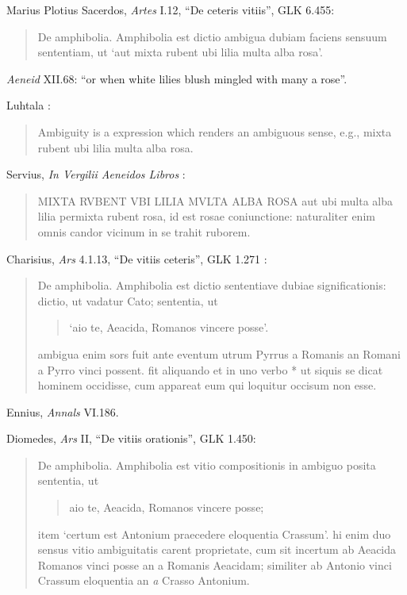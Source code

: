 \documentclass{article}
\begin{document}
Marius Plotius Sacerdos, {\em Artes} I.12, ``De ceteris vitiis'', GLK 6.455:

\begin{quote}
De amphibolia. Amphibolia est dictio ambigua dubiam faciens sensuum sententiam, ut `aut mixta
rubent ubi lilia multa alba rosa'.
\end{quote}

{\em Aeneid} XII.68: ``or when white lilies blush mingled with many a rose''.

Luhtala \cite[p.~73]{luhtala}:

\begin{quote}
Ambiguity is a expression which renders an ambiguous sense, e.g., mixta rubent ubi
lilia multa alba rosa.
\end{quote}

Servius, {\em In Vergilii Aeneidos Libros} \cite[p.~582]{serviusII}:

\begin{quote}
MIXTA RVBENT VBI LILIA MVLTA ALBA ROSA aut ubi multa alba lilia permixta rubent rosa, id est rosae coniunctione: naturaliter enim omnis candor vicinum in se trahit ruborem.
\end{quote}

Charisius, {\em Ars} 4.1.13, ``De vitiis ceteris'', GLK 1.271 \cite[p.~271]{GLKI}:

\begin{quote}
De amphibolia. Amphibolia est dictio sententiave dubiae significationis:
dictio, ut vadatur Cato; sententia, ut
\begin{quote}
`aio te, Aeacida, Romanos vincere posse'.
\end{quote}
ambigua enim sors fuit ante eventum utrum Pyrrus a Romanis an
Romani a Pyrro vinci possent. fit aliquando et in uno verbo * ut siquis se dicat
hominem occidisse, cum appareat eum qui loquitur occisum non esse.
 \end{quote}

Ennius, {\em Annals} VI.186.

Diomedes, {\em Ars} II, ``De vitiis orationis'', GLK 1.450:

\begin{quote}
De amphibolia. Amphibolia est vitio compositionis in ambiguo posita
sententia, ut
\begin{quote}
aio te, Aeacida, Romanos vincere posse;
\end{quote}
item `certum est Antonium praecedere eloquentia Crassum'.
hi enim duo sensus vitio ambiguitatis carent proprietate, cum sit incertum
ab Aeacida Romanos vinci posse an a Romanis Aeacidam; similiter
ab Antonio vinci Crassum eloquentia an {\em a} Crasso Antonium.
\end{quote}
\end{document}
